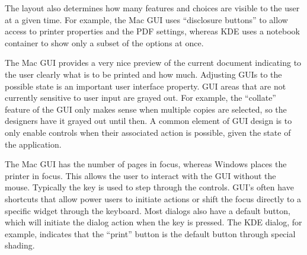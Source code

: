 The layout also determines how many features and choices are visible to the
user at a given time.  For example, the Mac GUI uses ``disclosure
buttons'' to allow access to printer properties and the PDF settings,
whereas KDE uses a notebook container to show only a subset of the
options at once.

The Mac GUI provides a very nice preview of the current document
indicating to the user clearly what is to be printed and how
much. Adjusting GUIs to the possible state is an important user
interface property.  GUI areas that are not currently sensitive to
user input are grayed out. For example, the ``collate'' feature of the
GUI only makes sense when multiple copies are selected, so the
designers have it grayed out until then. A common element of GUI
design is to only enable controls when their associated action is
possible, given the state of the application.

 
The Mac GUI has the number of pages in focus, whereas Windows places
the printer in focus. This allows the user to interact with the GUI
without the mouse. Typically the  key is used to step through
the controls. GUI's often have shortcuts that allow power users to
initiate actions or shift the focus directly to a specific widget
through the keyboard.  Most dialogs also have a default button, which
will initiate the dialog action when the  key is
pressed. The KDE dialog, for example, indicates that the ``print''
button is the default button through special shading.




